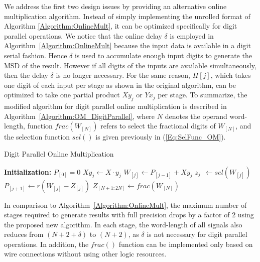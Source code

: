 \documentclass[conference]{IEEEtran}
\begin{document}
We address the first two design issues by providing an alternative online multiplication algorithm. Instead of simply implementing the unrolled format of Algorithm \ref{Algorithm:OnlineMult}, it can be optimized specifically for digit parallel operations. We notice that the online delay $\delta$ is employed in Algorithm~\ref{Algorithm:OnlineMult} because the input data is available in a digit serial fashion. Hence $\delta$ is used to accumulate enough input digits to generate the MSD of the result. However if all digits of the inputs are available simultaneously, then the delay $\delta$ is no longer necessary. For the same reason, $H[j]$, which takes one digit of each input per stage as shown in the original algorithm, can be optimized to take one partial product $Xy_j$ or $Yx_j$ per stage. To summarize, the modified algorithm for digit parallel online multiplication is described in Algorithm~\ref{Algorithm:OM_DigitParallel}, where $N$ denotes the operand word-length, function $frac(W_{[N]})$ refers to select the fractional digits of $W_{[N]}$, and the selection function $sel()$ is given previously in (\ref{Eq:SelFunc_OM}).

\begin{algorithm}[tbp]
  \caption{Digit Parallel Online Multiplication}\label{Algorithm:OM_DigitParallel}
  \begin{algorithmic}[1]
    \State \textbf{Initialization:} $P_{[0]}=0$						\vspace{.5ex}
    										\vspace{.5ex}
    	\State $Xy_j \leftarrow X \cdot y_j$						\vspace{.5ex}
    	\State $W_{[j]}    \leftarrow  P_{[j-1]} + Xy_j$			\vspace{.5ex}
     	\State $z_{j}  ~~      \leftarrow  sel(W_{[j]})$			\vspace{.5ex}
	 	\State $P_{[j+1]}  \leftarrow  r\left(W_{[j]}-Z_{[j]}\right)$	\vspace{.5ex}
    \EndFor															\vspace{.5ex}
    \State $Z_{[N+1:2N]} \leftarrow frac(W_{[N]})$
  \end{algorithmic}
\end{algorithm}

In comparison to Algorithm~\ref{Algorithm:OnlineMult}, the maximum number of stages required to generate results with full precision drops by a factor of 2 using the proposed new algorithm. In each stage, the word-length of all signals also reduces from $(N+2+\delta)$ to $(N+2)$, as $\delta$ is not necessary for digit parallel operations. In addition, the $frac()$ function can be implemented only based on wire connections without using other logic resources.
\end{document}
